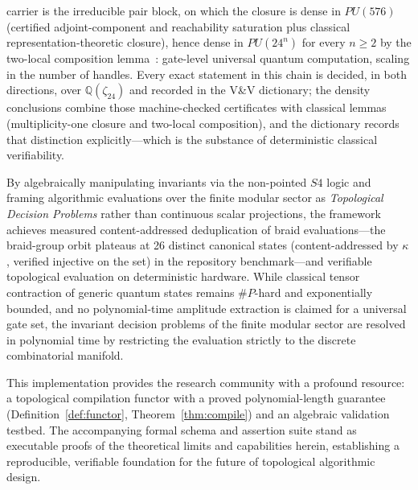 carrier is the irreducible pair block, on which the closure is dense in $PU(576)$ (certified adjoint-component and reachability saturation plus classical representation-theoretic closure), hence dense in $PU(24^{n})$ for every $n\ge 2$ by the two-local composition lemma~\cite{brylinski2002}: gate-level universal quantum computation, scaling in the number of handles. Every exact statement in this chain is decided, in both directions, over $\mathbb{Q}(\zeta_{24})$ and recorded in the V\&V dictionary; the density conclusions combine those machine-checked certificates with classical lemmas (multiplicity-one closure and two-local composition), and the dictionary records that distinction explicitly---which is the substance of deterministic classical verifiability.

By algebraically manipulating invariants via the non-pointed $S4$ logic and framing algorithmic evaluations over the finite modular sector as \textit{Topological Decision Problems} rather than continuous scalar projections, the framework achieves measured content-addressed deduplication of braid evaluations---the braid-group orbit plateaus at 26 distinct canonical states (content-addressed by $\kappa$, verified injective on the set) in the repository benchmark---and verifiable topological evaluation on deterministic hardware. While classical tensor contraction of generic quantum states remains $\#P$-hard and exponentially bounded, and no polynomial-time amplitude extraction is claimed for a universal gate set, the invariant decision problems of the finite modular sector are resolved in polynomial time by restricting the evaluation strictly to the discrete combinatorial manifold.

This implementation provides the research community with a profound resource: a topological compilation functor with a proved polynomial-length guarantee (Definition~\ref{def:functor}, Theorem~\ref{thm:compile}) and an algebraic validation testbed. The accompanying formal schema and assertion suite stand as executable proofs of the theoretical limits and capabilities herein, establishing a reproducible, verifiable foundation for the future of topological algorithmic design.

